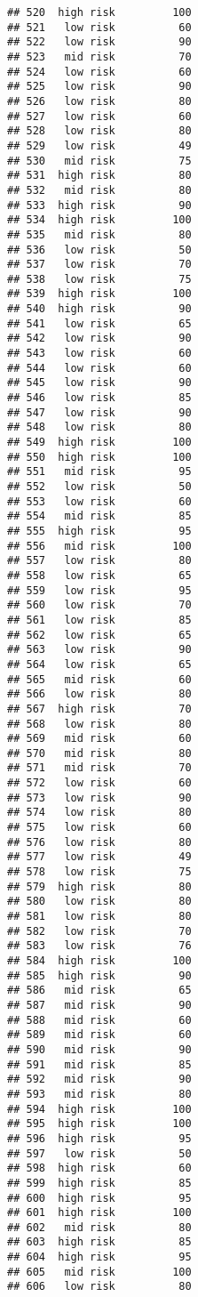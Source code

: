 \documentclass[
  ignorenonframetext,
]{beamer}
\begin{document}
\begin{frame}[fragile]
\begin{verbatim}
## 520  high risk         100
## 521   low risk          60
## 522   low risk          90
## 523   mid risk          70
## 524   low risk          60
## 525   low risk          90
## 526   low risk          80
## 527   low risk          60
## 528   low risk          80
## 529   low risk          49
## 530   mid risk          75
## 531  high risk          80
## 532   mid risk          80
## 533  high risk          90
## 534  high risk         100
## 535   mid risk          80
## 536   low risk          50
## 537   low risk          70
## 538   low risk          75
## 539  high risk         100
## 540  high risk          90
## 541   low risk          65
## 542   low risk          90
## 543   low risk          60
## 544   low risk          60
## 545   low risk          90
## 546   low risk          85
## 547   low risk          90
## 548   low risk          80
## 549  high risk         100
## 550  high risk         100
## 551   mid risk          95
## 552   low risk          50
## 553   low risk          60
## 554   mid risk          85
## 555  high risk          95
## 556   mid risk         100
## 557   low risk          80
## 558   low risk          65
## 559   low risk          95
## 560   low risk          70
## 561   low risk          85
## 562   low risk          65
## 563   low risk          90
## 564   low risk          65
## 565   mid risk          60
## 566   low risk          80
## 567  high risk          70
## 568   low risk          80
## 569   mid risk          60
## 570   mid risk          80
## 571   mid risk          70
## 572   low risk          60
## 573   low risk          90
## 574   low risk          80
## 575   low risk          60
## 576   low risk          80
## 577   low risk          49
## 578   low risk          75
## 579  high risk          80
## 580   low risk          80
## 581   low risk          80
## 582   low risk          70
## 583   low risk          76
## 584  high risk         100
## 585  high risk          90
## 586   mid risk          65
## 587   mid risk          90
## 588   mid risk          60
## 589   mid risk          60
## 590   mid risk          90
## 591   mid risk          85
## 592   mid risk          90
## 593   mid risk          80
## 594  high risk         100
## 595  high risk         100
## 596  high risk          95
## 597   low risk          50
## 598  high risk          60
## 599  high risk          85
## 600  high risk          95
## 601  high risk         100
## 602   mid risk          80
## 603  high risk          85
## 604  high risk          95
## 605   mid risk         100
## 606   low risk          80

\end{verbatim}
\end{frame}
\end{document}
